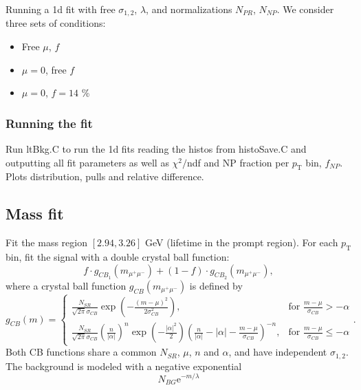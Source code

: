 \documentclass{article}
\newcommand{\pt}{p_\text{T}}
\begin{document}
Running a 1d fit with free $\sigma_{1,2}$, $\lambda$, and normalizations $N_{PR}$, $N_{NP}$. We consider three sets of conditions:
\begin{itemize}
\item Free $\mu$, $f$
\item $\mu=0$, free $f$
\item $\mu=0$, $f=14$ \%
\end{itemize} 

\subsubsection{Running the fit}

Run ltBkg.C to run the 1d fits reading the histos from histoSave.C and outputting all fit parameters as well as $\chi^2/$ndf and NP fraction per $\pt$ bin, $f_{NP}$. Plots distribution, pulls and relative difference.

\pagebreak

\subsection{Mass fit}

Fit the mass region $[2.94, 3.26]$ GeV (lifetime in the prompt region). For each $\pt$ bin, fit the signal with a double crystal ball function:
\begin{equation}
f\cdot g_{CB_1}(m_{\mu^+\mu^-})+(1-f)\cdot g_{CB_2}(m_{\mu^+\mu^-}),
\end{equation}
where a crystal ball function $g_{CB}(m_{\mu^+\mu^-})$ is defined by
\begin{equation}
g_{CB}(m) = \begin{cases}
\frac{N_{SR}}{\sqrt{2\pi}\sigma_{CB}}\exp\left(-\frac{(m-\mu)^2}{2\sigma^2_{CB}}\right), & \text{for }\frac{m-\mu}{\sigma_{CB}} > -\alpha \\
\frac{N_{SR}}{\sqrt{2\pi}\sigma_{CB}}\left(\frac{n}{|\alpha|}\right)^n\exp\left(-\frac{|\alpha|^2}{2}\right)\left(\frac{n}{|\alpha|}-|\alpha|-\frac{m-\mu}{\sigma_{CB}}\right)^{-n}, & \text{for }\frac{m-\mu}{\sigma_{CB}}\leq-\alpha
\end{cases}.
\end{equation}
Both CB functions share a common $N_{SR}$, $\mu$, $n$ and $\alpha$, and have independent $\sigma_{1,2}$. The background is modeled with a negative exponential
\begin{equation}
N_{BG} \text{e}^{- m / \lambda}
\end{equation}
\end{document}
